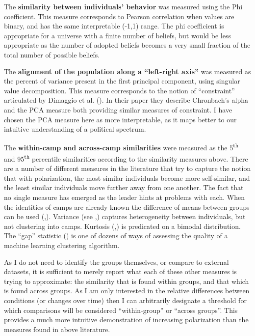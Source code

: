 \documentclass{article}
\begin{document}
The \textbf{similarity between individuals' behavior} was measured using the Phi coefficient. This measure corresponds to Pearson correlation when values are binary, and has the same interpretable (-1,1) range. 
The phi coefficient is appropriate for a universe with a finite number of beliefs, but would be less appropriate as the number of adopted beliefs becomes a very small fraction of the total number of possible beliefs. 

The \textbf{alignment of the population along a ``left-right axis''} was measured as the percent of variance present in the first principal component, using singular value decomposition.
This measure corresponds to the notion of “constraint” articulated by Dimaggio et al. (\cite{dimaggio1996have}). In their paper they describe Chronbach’s alpha and the PCA measure both providing similar measures of constraint. I have chosen the PCA measure here as more interpretable, as it maps better to our intuitive understanding of a political spectrum.

The \textbf{within-camp and across-camp similarities} were measured as the 5\textsuperscript{th} and 95\textsuperscript{th} percentile similarities according to the similarity measures above. 
There are a number of different measures in the literature that try to capture the notion that with polarization, the most similar individuals become more self-similar, and the least similar individuals move further away from one another. 
The fact that no single measure has emerged as the leader hints at problems with each.
When the identities of camps are already known the difference of means between groups can be used (\cite{becker2019wisdom},\cite{dimaggio1996have}). 
Variance (see \cite{baldassarri2007dynamics},\cite{dimaggio1996have}) captures heterogeneity between individuals, but not clustering into camps. 
Kurtosis (\cite{baldassarri2007dynamics},\cite{dimaggio1996have}) is predicated on a bimodal distribution. 
The “gap” statistic (\cite{goldberg2018beyond}) is one of dozens of ways of assessing the quality of a machine learning clustering algorithm.

As I do not need to identify the groups themselves, or compare to external datasets, it is sufficient to merely report what each of these other measures is trying to approximate: the similarity that is found within groups, and that which is found across groups. As I am only interested in the relative differences between conditions (or changes over time) then I can arbitrarily designate a threshold for which comparisons will be considered ``within-group'' or ``across groups''. This provides a much more intuitive demonstration of increasing polarization than the measures found in above literature.
\end{document}
